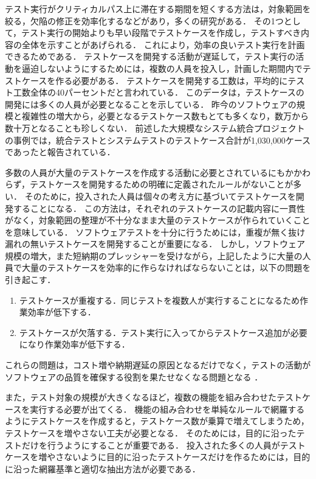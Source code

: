テスト実行がクリティカルパス上に滞在する期間を短くする方法は，対象範囲を絞る\cite{rothermel2002empirical}，欠陥の修正を効率化する\cite{matsuodani2004evaluation}などがあり，多くの研究がある\cite{beer2008role}\cite{weinberg2008perfect}．
その1つとして，テスト実行の開始よりも早い段階でテストケースを作成し，テストすべき内容の全体を示すことがあげられる．
これにより，効率の良いテスト実行を計画できるためである．
テストケースを開発する活動が遅延して，テスト実行の活動を逼迫しないようにするためには，複数の人員を投入し，計画した期間内でテストケースを作る必要がある．
テストケースを開発する工数は，平均的にテスト工数全体の40パーセントだと言われている\cite{van2013tpi}．
このデータは，テストケースの開発には多くの人員が必要となることを示している．
昨今のソフトウェアの規模と複雑性の増大から，必要となるテストケース数もとても多くなり，数万から数十万となることも珍しくない．
前述した大規模なシステム統合プロジェクトの事例では，統合テストとシステムテストのテストケース合計が1,030,000ケースであったと報告されている．

多数の人員が大量のテストケースを作成する活動に必要とされているにもかかわらず，テストケースを開発するための明確に定義されたルールがないことが多い．
そのために，投入された人員は個々の考え方に基づいてテストケースを開発することになる．
この方法は，それぞれのテストケースの記載内容に一貫性がなく，対象範囲の整理が不十分なまま大量のテストケースが作られていくことを意味している．
ソフトウェアテストを十分に行うためには，重複が無く抜け漏れの無いテストケースを開発することが重要になる．
しかし，ソフトウェア規模の増大，また短納期のプレッシャーを受けながら，上記したように大量の人員で大量のテストケースを効率的に作らなければならないことは，以下の問題を引き起こす．
\begin{enumerate}
\item テストケースが重複する．同じテストを複数人が実行することになるため作業効率が低下する．
\item テストケースが欠落する．テスト実行に入ってからテストケース追加が必要になり作業効率が低下する．
\end{enumerate}

これらの問題は，コスト増や納期遅延の原因となるだけでなく，テストの活動がソフトウェアの品質を確保する役割を果たせなくなる問題となる
\cite{bertolino2007software}
\cite{mantyla2013more}
\cite{mantyla2014time}．

また，テスト対象の規模が大きくなるほど，複数の機能を組み合わせたテストケースを実行する必要が出てくる．
機能の組み合わせを単純なルールで網羅するようにテストケースを作成すると，テストケース数が乗算で増えてしまうため，テストケースを増やさない工夫が必要となる．
そのためには，目的に沿ったテストだけを行うようにすることが重要である\cite{kaner2008lessons}．
投入された多くの人員がテストケースを増やさないように目的に沿ったテストケースだけを作るためには，目的に沿った網羅基準と適切な抽出方法が必要である．

